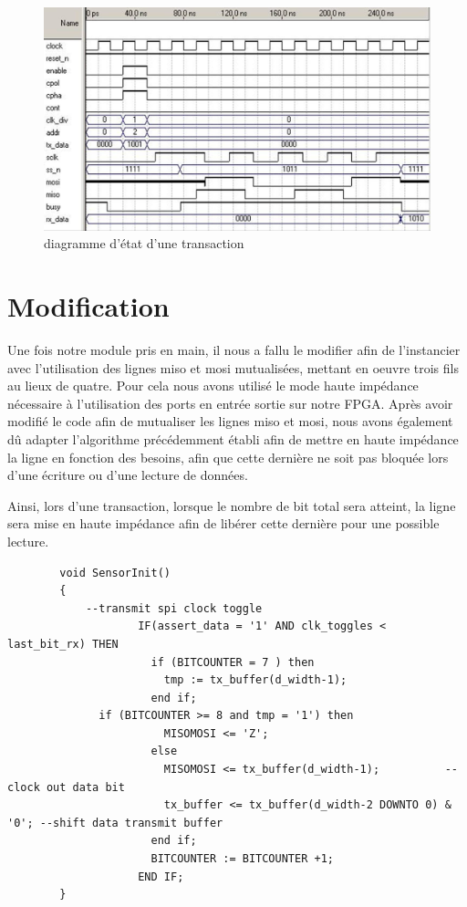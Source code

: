\documentclass[french,a4paper,12pt]{report}
\begin{document}
	\begin{figure}[!ht]
    \center
  	\includegraphics[width=12cm]{transaction_timing_diagram_web.JPG}
    \caption{diagramme d'état d'une transaction}
	\end{figure}
	
	\section{Modification}
		Une fois notre module pris en main, il nous a fallu le modifier afin de l'instancier avec l'utilisation des lignes miso et mosi mutualisées, mettant en oeuvre trois fils au lieux de quatre. Pour cela nous avons utilisé le mode haute impédance nécessaire à l'utilisation des ports en entrée sortie sur notre FPGA. Après avoir modifié le code afin de mutualiser les lignes miso et mosi, nous avons également dû adapter l'algorithme précédemment établi afin de mettre en haute impédance la ligne en fonction des besoins, afin que cette dernière ne soit pas bloquée lors d'une écriture ou d'une lecture de données. 
		
		Ainsi, lors d'une transaction, lorsque le nombre de bit total sera atteint, la ligne sera mise en haute impédance afin de libérer cette dernière pour une possible lecture.
		
	\begin{lstlisting}
 		void SensorInit()
		{
			--transmit spi clock toggle
					IF(assert_data = '1' AND clk_toggles < last_bit_rx) THEN
					  if (BITCOUNTER = 7 ) then
					  	tmp := tx_buffer(d_width-1);
					  end if;				
  	          if (BITCOUNTER >= 8 and tmp = '1') then
					  	MISOMOSI <= 'Z';				  
					  else 
					  	MISOMOSI <= tx_buffer(d_width-1);          --clock out data bit
					  	tx_buffer <= tx_buffer(d_width-2 DOWNTO 0) & '0'; --shift data transmit buffer				  
					  end if;				  
					  BITCOUNTER := BITCOUNTER +1;
					END IF;
		}
	\end{lstlisting}
	
\end{document}

